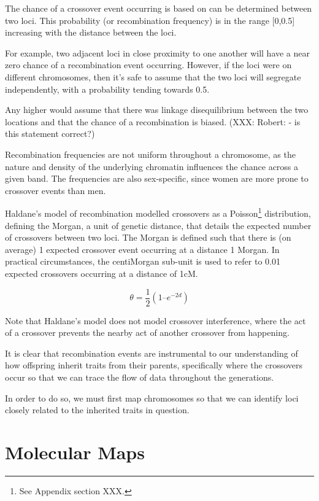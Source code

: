 The chance of a crossover event occurring is based on can be determined between two loci. This probability (or \gls{recombination  frequency}) is in the range [0,0.5] increasing with the distance between the loci.

For example,  two adjacent loci in close proximity to one another will have a near zero chance of a recombination event occurring. However, if the loci were on different chromosomes, then it's safe to assume that the two loci will segregate independently, with a probability tending towards 0.5.

Any higher would assume that there was \gls{linkage disequilibrium} between the two locations and that the chance of a recombination is biased. (XXX: Robert: - is this statement correct?)

Recombination frequencies are not uniform throughout a chromosome, as the nature and density of the underlying chromatin influences the chance across a given band. The frequencies are also sex-specific, since women are more prone to crossover events than men.

Haldane's model of recombination modelled crossovers as a Poisson\footnote{See Appendix section XXX.} distribution, defining the \gls{Morgan}, a unit of genetic distance, that details the expected number of crossovers between two loci. The Morgan is defined such that there is (on average) 1 expected crossover event occurring at a distance 1 Morgan.  In practical circumstances, the centiMorgan sub-unit is used to refer to 0.01 expected crossovers occurring at a distance of 1cM. 

\begin{equation}
\theta = \frac{1}{2} (1 –  e^{-2d})
\end{equation}

Note that Haldane’s model does not model \gls{crossover interference}, where the act of a crossover prevents the nearby act of another crossover from happening. 

It is clear that recombination events are instrumental to our understanding of how offspring inherit traits from their parents, specifically where the crossovers occur so that we can trace the flow of data throughout the generations.

In order to do so, we must first map chromosomes so that we can identify loci closely related to the inherited traits in question. 

\section{Molecular Maps}

